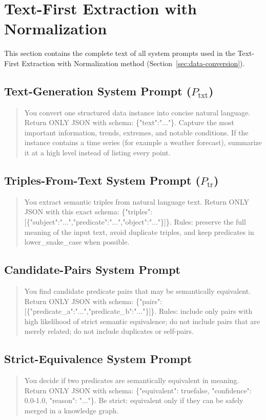 \section{Text-First Extraction with Normalization}
\label{app:prompts-text-first}

This section contains the complete text of all system prompts used in the Text-First Extraction with Normalization method (Section~\ref{sec:data-conversion}).

\subsection*{Text-Generation System Prompt ($P_{\mathrm{txt}}$)}
\begin{quote}
You convert one structured data instance into concise natural language. Return ONLY JSON with schema: \{"text":"..."\}. Capture the most important information, trends, extremes, and notable conditions. If the instance contains a time series (for example a weather forecast), summarize it at a high level instead of listing every point.
\end{quote}

\subsection*{Triples-From-Text System Prompt ($P_{\mathrm{tr}}$)}
\begin{quote}
You extract semantic triples from natural language text. Return ONLY JSON with this exact schema: \{"triples":[\{"subject":"...","predicate":"...","object":"..."\}]\}. Rules: preserve the full meaning of the input text, avoid duplicate triples, and keep predicates in lower\_snake\_case when possible.
\end{quote}

\subsection*{Candidate-Pairs System Prompt}
\begin{quote}
You find candidate predicate pairs that may be semantically equivalent. Return ONLY JSON with schema: \{"pairs":[\{"predicate\_a":"...","predicate\_b":"..."\}]\}. Rules: include only pairs with high likelihood of strict semantic equivalence; do not include pairs that are merely related; do not include duplicates or self-pairs.
\end{quote}

\subsection*{Strict-Equivalence System Prompt}
\begin{quote}
You decide if two predicates are semantically equivalent in meaning. Return ONLY JSON with schema: \{"equivalent": true\textbar false, "confidence": 0.0-1.0, "reason": "..."\}. Be strict: equivalent only if they can be safely merged in a knowledge graph.
\end{quote}
